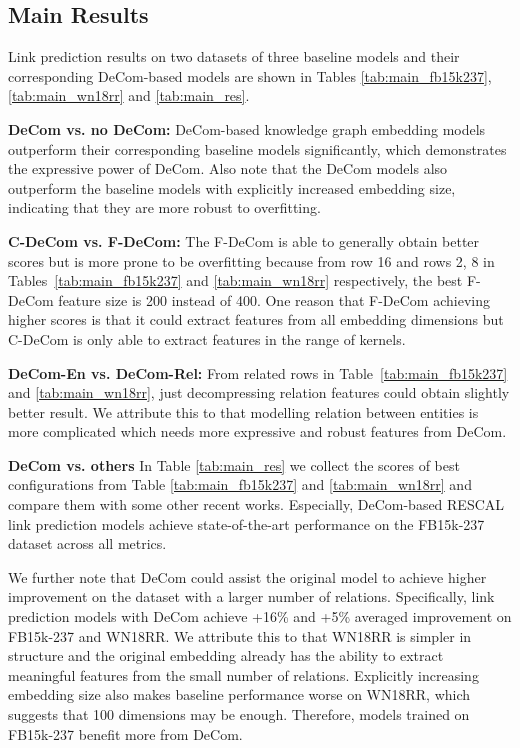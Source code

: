 \documentclass[letterpaper]{article} \usepackage{aaai20}  \usepackage{times}  \usepackage{helvet} \usepackage{courier}  \usepackage{booktabs}
\begin{document}
 

\subsection{Main Results}
Link prediction results on two datasets of three baseline models and their corresponding DeCom-based models are shown in Tables \ref{tab:main_fb15k237}, \ref{tab:main_wn18rr} and \ref{tab:main_res}. 

\textbf{DeCom vs. no DeCom:} DeCom-based knowledge graph embedding models outperform their corresponding baseline models significantly, which demonstrates the expressive power of DeCom. Also note that the DeCom models also outperform the baseline models with explicitly increased embedding size, indicating that they are more robust to overfitting.

\textbf{C-DeCom vs. F-DeCom:} The F-DeCom is able to generally obtain better scores but is more prone to be overfitting because from row 16 and rows 2, 8 in Tables~\ref{tab:main_fb15k237} and \ref{tab:main_wn18rr} respectively, the best F-DeCom feature size is 200 instead of 400. One reason that F-DeCom achieving higher scores is that it could extract features from all embedding dimensions but C-DeCom is only able to extract features in the range of kernels.


\textbf{DeCom-En vs. DeCom-Rel:} From related rows in Table~\ref{tab:main_fb15k237} and \ref{tab:main_wn18rr}, just decompressing relation features could obtain slightly better result. We attribute this to that modelling relation between entities is more complicated which needs more expressive and robust features from DeCom.

\textbf{DeCom vs. others} In Table \ref{tab:main_res} we collect the scores of best configurations from Table \ref{tab:main_fb15k237} and \ref{tab:main_wn18rr} and compare them with some other recent works. Especially, DeCom-based RESCAL link prediction models achieve state-of-the-art performance on the FB15k-237 dataset across all metrics.


We further note that DeCom could assist the original model to achieve higher improvement on the dataset with a larger number of relations. Specifically, link prediction models with DeCom achieve +16\% and +5\% averaged improvement on FB15k-237 and WN18RR. We attribute this to that WN18RR is simpler in structure and the original embedding already has the ability to extract meaningful features from the small number of relations. Explicitly increasing embedding size also makes baseline performance worse on WN18RR, which suggests that 100 dimensions may be enough. Therefore, models trained on FB15k-237 benefit more from DeCom.
\end{document}
